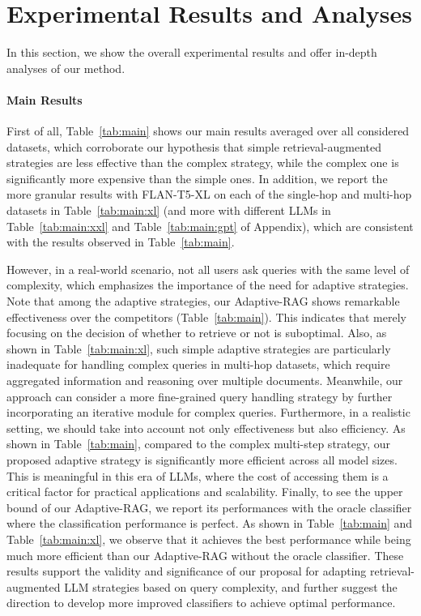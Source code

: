 \section{Experimental Results and Analyses}
In this section, we show the overall experimental results and offer in-depth analyses of our method.


\paragraph{Main Results}
First of all, Table~\ref{tab:main} shows our main results averaged over all considered datasets, which corroborate our hypothesis that simple retrieval-augmented strategies are less effective than the complex strategy, while the complex one is significantly more expensive than the simple ones. In addition, we report the more granular results with FLAN-T5-XL on each of the single-hop and multi-hop datasets in Table~\ref{tab:main:xl} (and more with different LLMs in Table~\ref{tab:main:xxl} and Table~\ref{tab:main:gpt} of Appendix), which are consistent with the results observed in Table~\ref{tab:main}.


However, in a real-world scenario, not all users ask queries with the same level of complexity, which emphasizes the importance of the need for adaptive strategies. Note that among the adaptive strategies, our Adaptive-RAG shows remarkable effectiveness over the competitors (Table~\ref{tab:main}). This indicates that merely focusing on the decision of whether to retrieve or not is suboptimal. Also, as shown in Table~\ref{tab:main:xl}, such simple adaptive strategies are particularly inadequate for handling complex queries in multi-hop datasets, which require aggregated information and reasoning over multiple documents. Meanwhile, our approach can consider a more fine-grained query handling strategy by further incorporating an iterative module for complex queries. 
Furthermore, in a realistic setting, we should take into account not only effectiveness but also efficiency. As shown in Table~\ref{tab:main}, compared to the complex multi-step strategy, our proposed adaptive strategy is significantly more efficient across all model sizes. This is meaningful in this era of LLMs, where the cost of accessing them is a critical factor for practical applications and scalability.
Finally, to see the upper bound of our Adaptive-RAG, we report its performances with the oracle classifier where the classification performance is perfect. As shown in Table~\ref{tab:main} and Table~\ref{tab:main:xl}, we observe that it achieves the best performance while being much more efficient than our Adaptive-RAG without the oracle classifier. These results support the validity and significance of our proposal for adapting retrieval-augmented LLM strategies based on query complexity, and further suggest the direction to develop more improved classifiers to achieve optimal performance.


